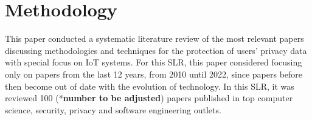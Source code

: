 \documentclass[conference]{IEEEtran}
\begin{document}


\section{Methodology}

This paper conducted a systematic literature review of the most relevant papers
discussing methodologies and techniques for the protection of users' privacy
data with special focus on IoT systems. For this SLR, this paper considered focusing
only on papers from the last 12 years, from 2010 until 2022, since papers before
then become out of date with the evolution of technology. In this SLR, it was reviewed 100
(*\textbf{\color{red}number to be adjusted}) papers published in top computer
science, security, privacy and software engineering outlets.
\end{document}
